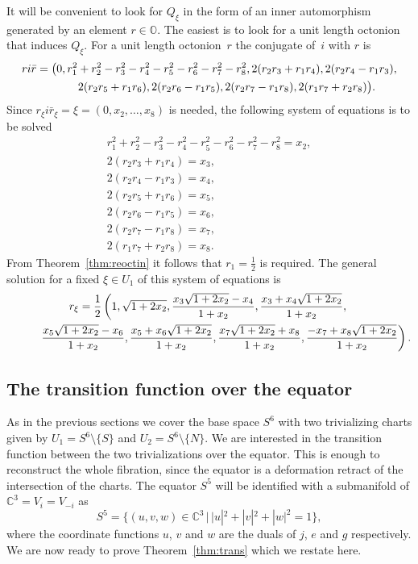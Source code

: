 \documentclass[10pt,a4paper]{amsart}
\numberwithin{equation}{section}
\newcommand{\SO}{\mathbb{O}} %
\begin{document}
It will be convenient to look for $Q_\xi$ in the form of an inner automorphism generated by an element $r \in \SO$. The easiest is to look for a unit length octonion that induces $Q_\xi$. For a unit length octonion~$r$ the conjugate of~$i$ with $r$ is
\begin{gather*} ri\bar{r}=\big(0,r_1^2+r_2^2-r_3^2-r_4^2-r_5^2-r_6^2-r_7^2-r_8^2,2(r_2r_3+r_1r_4),2(r_2r_4-r_1r_3),\\
\hphantom{ri\bar{r}=\big(}{} 2(r_2r_5+r_1r_6),2(r_2r_6-r_1r_5),2(r_2r_7-r_1r_8),2(r_1r_7+r_2r_8)\big).\end{gather*}
Since $r_\xi i\bar{r}_\xi=\xi=(0,x_2,\dots,x_8)$ is needed, the following system of equations is to be solved
\begin{gather*}
r_1^2+r_2^2-r_3^2-r_4^2-r_5^2-r_6^2-r_7^2-r_8^2 = x_2,\\
2(r_2r_3+r_1r_4) = x_3, \\
2(r_2r_4-r_1r_3) = x_4, \\
2(r_2r_5+r_1r_6) = x_5, \\
2(r_2r_6-r_1r_5) = x_6, \\
2(r_2r_7-r_1r_8) = x_7, \\
2(r_1r_7+r_2r_8) = x_8.
\end{gather*}
From Theorem~\ref{thm:reoctin} it follows that $r_1=\frac{1}{2}$ is required. The general solution for a fixed $\xi \in U_1$ of this system of equations is
\begin{gather}
r_\xi= \frac{1}{2}\left(1, \sqrt{1+2x_2},\frac{x_3\sqrt{1+2x_2}-x_4}{1+x_2},\frac{x_3+x_4\sqrt{1+2x_2}}{1+x_2}, \right.\nonumber\\
\left.\hphantom{r_\xi= \frac{1}{2}}{}\frac{x_5\sqrt{1+2x_2}-x_6}{1+x_2},\frac{x_5+x_6\sqrt{1+2x_2}}{1+x_2},\frac{x_7\sqrt{1 + 2 x_2} + x_8}{1+x_2},\frac{-x_7 + x_8\sqrt{1 + 2 x_2}}{1+x_2}\right).\label{eq:octhopfsol}
\end{gather}

\subsection{The transition function over the equator}\label{section3.2}
As in the previous sections we cover the base space $S^6$ with two trivializing charts given by $U_1=S^6 {\setminus} \{S\} $ and $U_2=S^6 {\setminus} \{N\}$.
We are interested in the transition function between the two trivializations over the equator. This is enough to reconstruct the whole fibration, since the equator is a deformation retract of the intersection of the charts. The equator $S^5$ will be identified with a submanifold of $\mathbb{C}^3=V_i=V_{-i}$ as
\[ S^5=\big\{(u,v,w) \in \mathbb{C}^3 \,|\, |u|^2+|v|^2+|w|^2=1\big\}, \]
where the coordinate functions $u$, $v$ and $w$ are the duals of $j$, $e$ and $g$ respectively. We are now ready to prove Theorem~\ref{thm:trans} which we restate here.
\end{document}
